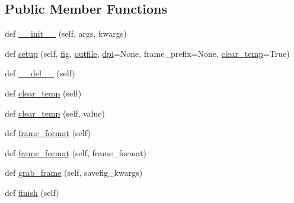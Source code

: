\subsection*{Public Member Functions}
\begin{DoxyCompactItemize}
\item 
def \hyperlink{classmatplotlib_1_1animation_1_1FileMovieWriter_afded2f6d5d2cb09309ebdeb70f624b98}{\+\_\+\+\_\+init\+\_\+\+\_\+} (self, args, kwargs)
\item 
def \hyperlink{classmatplotlib_1_1animation_1_1FileMovieWriter_a79426b2dc3bc5c4eefac4f8197c56209}{setup} (self, \hyperlink{classmatplotlib_1_1animation_1_1FileMovieWriter_ac61243658714a398ea13b2821a756647}{fig}, \hyperlink{classmatplotlib_1_1animation_1_1FileMovieWriter_ae3ef0c1fca69da36e21ce4e65be58439}{outfile}, \hyperlink{classmatplotlib_1_1animation_1_1FileMovieWriter_acb15d67886c11ad2174b258d7a340a45}{dpi}=None, frame\+\_\+prefix=None, \hyperlink{classmatplotlib_1_1animation_1_1FileMovieWriter_a23447a6889e37d7bcbd6b8ca010ae4f6}{clear\+\_\+temp}=True)
\item 
def \hyperlink{classmatplotlib_1_1animation_1_1FileMovieWriter_ae074cc81d2fd9440e6b104c4cb9e8f0b}{\+\_\+\+\_\+del\+\_\+\+\_\+} (self)
\item 
def \hyperlink{classmatplotlib_1_1animation_1_1FileMovieWriter_a23447a6889e37d7bcbd6b8ca010ae4f6}{clear\+\_\+temp} (self)
\item 
def \hyperlink{classmatplotlib_1_1animation_1_1FileMovieWriter_a9ae7267e754ee3c694339d665f9ae751}{clear\+\_\+temp} (self, value)
\item 
def \hyperlink{classmatplotlib_1_1animation_1_1FileMovieWriter_a9eb5960184f56b9eb76c3edee1aced9c}{frame\+\_\+format} (self)
\item 
def \hyperlink{classmatplotlib_1_1animation_1_1FileMovieWriter_ae600d710b822c37ccea5bbfbc60dd7fd}{frame\+\_\+format} (self, frame\+\_\+format)
\item 
def \hyperlink{classmatplotlib_1_1animation_1_1FileMovieWriter_a65039273557da2aec53f08944ad4e388}{grab\+\_\+frame} (self, savefig\+\_\+kwargs)
\item 
def \hyperlink{classmatplotlib_1_1animation_1_1FileMovieWriter_afae9e9083f1896d54e59ca42517b2b32}{finish} (self)
\end{DoxyCompactItemize}
